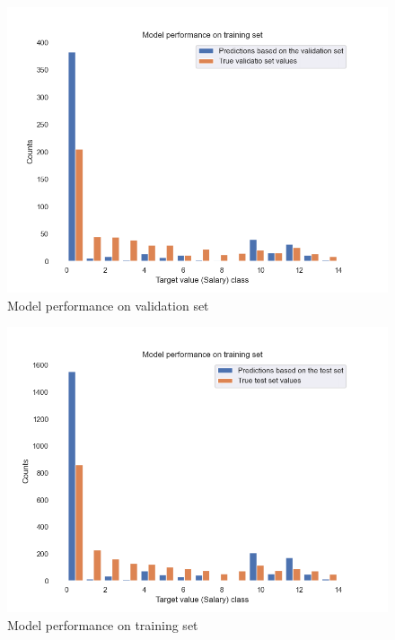 \documentclass[10pt,onecolumn,letterpaper]{article}
\begin{document}
\begin{figure}[htbp]
  \centering
  \includegraphics[width=.75\textwidth]{f8.png}
  \caption{Model performance on validation set}
\end{figure}

\begin{figure}[htbp]
  \centering
  \includegraphics[width=.75\textwidth]{f9.png}
  \caption{Model performance on training set}
\end{figure}
\end{document}
